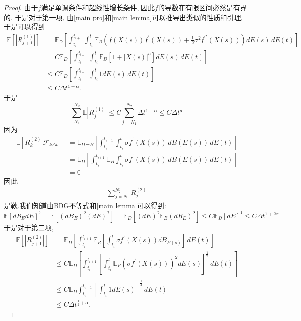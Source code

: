 \begin{proof}
	由于$f$满足单调条件和超线性增长条件, 因此$f$的导数在有限区间必然是有界的. 
	于是对于第一项,  由\cref{main pro}和\cref{main lemma}可以推导出类似的性质和引理, 于是可以得到
	\begin{align*}
		\mathbb{E} \left[|R_{j+1}^{(1)}| \right] &= \mathbb{E}_D \left[
		\int_{t_i}^{t_{i+1}} \int_{t_i}^{t}  \mathbb{E}_B \left( f(X(s)) f^{\prime}(X(s)) + \frac{1}{2} \sigma^2 f^{\prime\prime}(X(s)) \right) dE(s) \, dE(t)
		\right] \\
		&= C\mathbb{E}_D \left[
		\int_{t_i}^{t_{i+1}} \int_{t_i}^{t}  \mathbb{E}_B \left[1+|X(s)|^a \right] dE(s) \, dE(t)
		\right] \\
		& \le C\mathbb{E}_D \left[
		\int_{t_i}^{t_{i+1}} \int_{t_i}^{t}  1 dE(s) \, dE(t)
		\right] \\
		&\le C\Delta t^{1+\alpha}. 
	\end{align*}
	于是
	\begin{equation}
		\sum\limits_{N_1}^{N_2}\mathbb{E}\left|R_{j}^{(1)}\right| \leq
		C\sum\limits_{j=N_1}^{N_2}\Delta t^{1+\alpha} \le C\Delta t^\alpha
	\end{equation}
	因为
	\begin{align*}
		\mathbb{E}\left[ R_{k}^{(2)}|\mathcal{F}_{k\Delta t} \right] &= \mathbb{E}_D\mathbb{E}_B\left[ \int_{t_i}^{t_{i+1}} \int_{t_i}^{t} \sigma f^{\prime}(X(s)) \, dB(E(s)) \, dE(t) \right]\\
		&=\mathbb{E}_D\left[ \int_{t_i}^{t_{i+1}} \mathbb{E}_B\int_{t_i}^{t} \sigma f^{\prime}(X(s)) \, dB(E(s)) \, dE(t) \right]\\
		&= 0
	\end{align*}
	因此
	\begin{align*}
		\sum_{j=N_1}^{N_2}R_{j}^{(2)} 
	\end{align*}
	是鞅.我们知道由BDG不等式和\cref{main lemma}可以得到:
	\begin{equation*}
		\mathbb{E}[dB_EdE]^2=\mathbb{E}[(dB_E)^2(dE)^2]=\mathbb{E}_D[(dE)^2\mathbb{E}_B(dB_E)^2]\leq
		C\mathbb{E}_{D}[dE]^3\leq C\Delta t ^{1+2\alpha}
	\end{equation*}
	于是对于第二项, 
	\begin{align*}
		\mathbb{E} \left[|R_{j+1}^{(2)}| \right] &= \mathbb{E}_D \left[
		\int_{t_i}^{t_{i+1}} \mathbb{E}_B  \left[\int_{t_i}^{t}  \sigma f^{\prime}(X(s)) dB_{E(s)}\right] \, dE(t)
		\right] \\
		& \le C\mathbb{E}_D \left[
		\int_{t_i}^{t_{i+1}} \left[\int_{t_i}^{t}  \mathbb{E}_B\left(\sigma f^{\prime}(X(s))\right)^2 dE(s)\right]^{\frac{1}{2}} \, dE(t)
		\right] \\
		&\le C \mathbb{E}_D 
		\int_{t_i}^{t_{i+1}} \left[\int_{t_i}^{t}  1 dE(s)\right]^{\frac{1}{2}} \, dE(t)\\
		&\le C\Delta t^{\frac{1}{2}+\alpha}. 
	\end{align*}
	

\end{proof}
